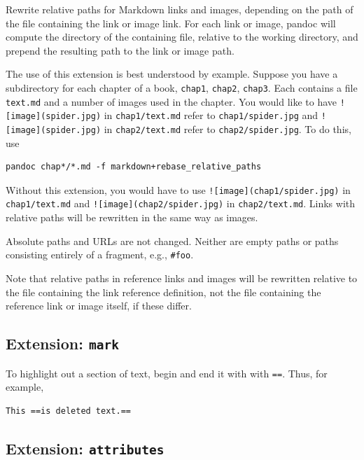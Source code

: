 \documentclass[
  b5paper
]{book}
\begin{document}
Rewrite relative paths for Markdown links and images, depending on the
path of the file containing the link or image link. For each link or
image, pandoc will compute the directory of the containing file,
relative to the working directory, and prepend the resulting path to the
link or image path.

The use of this extension is best understood by example. Suppose you
have a subdirectory for each chapter of a book, \texttt{chap1},
\texttt{chap2}, \texttt{chap3}. Each contains a file \texttt{text.md}
and a number of images used in the chapter. You would like to have
\texttt{!{[}image{]}(spider.jpg)} in \texttt{chap1/text.md} refer to
\texttt{chap1/spider.jpg} and \texttt{!{[}image{]}(spider.jpg)} in
\texttt{chap2/text.md} refer to \texttt{chap2/spider.jpg}. To do this,
use

\begin{verbatim}
pandoc chap*/*.md -f markdown+rebase_relative_paths
\end{verbatim}

Without this extension, you would have to use
\texttt{!{[}image{]}(chap1/spider.jpg)} in \texttt{chap1/text.md} and
\texttt{!{[}image{]}(chap2/spider.jpg)} in \texttt{chap2/text.md}. Links
with relative paths will be rewritten in the same way as images.

Absolute paths and URLs are not changed. Neither are empty paths or
paths consisting entirely of a fragment, e.g., \texttt{\#foo}.

Note that relative paths in reference links and images will be rewritten
relative to the file containing the link reference definition, not the
file containing the reference link or image itself, if these differ.

\subsection{\texorpdfstring{Extension:
\texttt{mark}}{Extension: mark}}\label{extension-mark}

To highlight out a section of text, begin and end it with with
\texttt{==}. Thus, for example,

\begin{verbatim}
This ==is deleted text.==
\end{verbatim}

\subsection{\texorpdfstring{Extension:
\texttt{attributes}}{Extension: attributes}}\label{extension-attributes}
\end{document}
